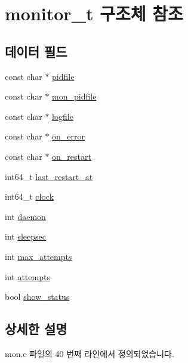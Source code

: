 \hypertarget{structmonitor__t}{}\section{monitor\+\_\+t 구조체 참조}
\label{structmonitor__t}
\subsection*{데이터 필드}
\begin{DoxyCompactItemize}
\item 
const char $\ast$ \mbox{\hyperlink{structmonitor__t_a8830aa2e0c02643ac374c22a7ec45927}{pidfile}}
\item 
const char $\ast$ \mbox{\hyperlink{structmonitor__t_a712e76ffbba90ae6dd9fc34358d9c61a}{mon\+\_\+pidfile}}
\item 
const char $\ast$ \mbox{\hyperlink{structmonitor__t_abeb07ab8d2a220cc47b452df88e215c6}{logfile}}
\item 
const char $\ast$ \mbox{\hyperlink{structmonitor__t_ab514f48550a574b4d4aae429e438a364}{on\+\_\+error}}
\item 
const char $\ast$ \mbox{\hyperlink{structmonitor__t_a09314c308617f1b0d43b0fda3534e6bc}{on\+\_\+restart}}
\item 
int64\+\_\+t \mbox{\hyperlink{structmonitor__t_ab0af45705221f0a83fad6c76d8270d96}{last\+\_\+restart\+\_\+at}}
\item 
int64\+\_\+t \mbox{\hyperlink{structmonitor__t_a7fee2cd825964374560ba13a35dd5fb9}{clock}}
\item 
int \mbox{\hyperlink{structmonitor__t_a5f5d66e215dbfe2731ee08651bcd24ea}{daemon}}
\item 
int \mbox{\hyperlink{structmonitor__t_acde0aafaec476d70d238a3bb241c2f57}{sleepsec}}
\item 
int \mbox{\hyperlink{structmonitor__t_a427617e80b40230fd67707e8e9d2a91a}{max\+\_\+attempts}}
\item 
int \mbox{\hyperlink{structmonitor__t_a8e1de2175d8aeda26c2b0725b91632a8}{attempts}}
\item 
bool \mbox{\hyperlink{structmonitor__t_a205230e4a8d4dffa50c61ca0c433c2f5}{show\+\_\+status}}
\end{DoxyCompactItemize}


\subsection{상세한 설명}


mon.\+c 파일의 40 번째 라인에서 정의되었습니다.



